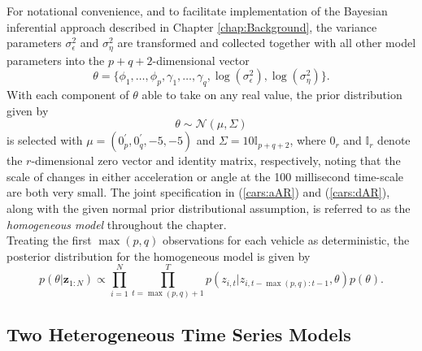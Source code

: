 \documentclass[
12pt, %
onehalfspacing, %
nohyperref, %
headsepline, %
chapterinoneline, %
]{MastersDoctoralThesis} %
\begin{document}
For notational convenience, and to facilitate implementation of the Bayesian inferential approach described in Chapter \ref{chap:Background}, the variance parameters $\sigma^2_{\epsilon}$ and $\sigma^2_{\eta}$ are transformed and collected together with all other model parameters into the $p + q + 2$-dimensional vector
\begin{equation*}
\label{cars:thetaVec}
\theta = \{\phi_{1}, \ldots, \phi_{p}, \gamma_{1}, \ldots, \gamma_{q}, \log(\sigma^{2}_{\epsilon}), \log(\sigma^{2}_{\eta})\}.
\end{equation*}
With each component of $\theta$ able to take on any real value, the prior distribution given by
\begin{equation}
\label{cars:indPrior}
\theta \sim \mathcal{N}\left(\mu, \Sigma \right)
\end{equation}
is selected with $\mu=(0_p^{\prime},0_q^{\prime},-5, -5)$ and $\Sigma = 10 \mathbb{I}_{p+q+2}$, where $0_r$ and $\mathbb{I}_r$ denote the $r$-dimensional zero vector and identity matrix, respectively, noting that the scale of changes in either acceleration or angle at the 100 millisecond time-scale are both very small. The joint specification in (\ref{cars:aAR}) and (\ref{cars:dAR}), along with the given normal prior distributional assumption, is referred to as the \textit{homogeneous model} throughout the chapter.
\\
Treating the first $\max(p, q)$ observations for each vehicle as deterministic, the posterior distribution for the homogeneous model is given by
\begin{equation}
\label{cars:homogPost}
p(\theta | \textbf{z}_{1:N}) \propto \prod_{i=1}^N \prod_{t = \max(p, q) + 1}^T p(z_{i, t} | z_{i, t-\max(p, q):t-1}, \theta)p(\theta).
\end{equation}

\subsection{Two Heterogeneous Time Series Models}
\label{subsec:carsheterogeneous}
\end{document}
